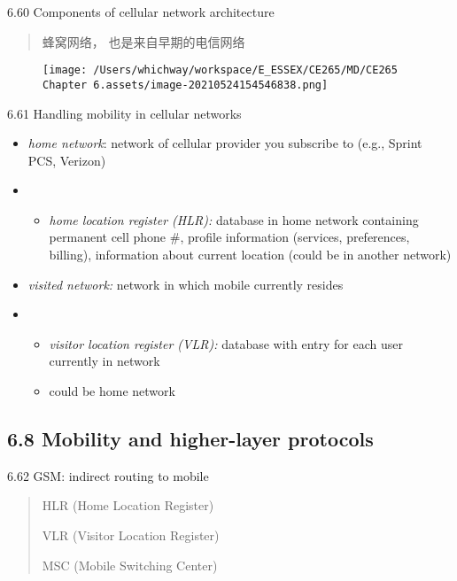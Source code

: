 \documentclass[
]{article}
\begin{document}
6.60 Components of cellular network architecture

\begin{quote}
蜂窝网络， 也是来自早期的电信网络
\end{quote}

\begin{figure}
\centering
\texttt{[image: /Users/whichway/workspace/E\_ESSEX/CE265/MD/CE265 Chapter 6.assets/image-20210524154546838.png]}
\caption{}
\end{figure}

6.61 Handling mobility in cellular networks

\begin{itemize}
\item
  \emph{home network}: network of cellular provider you subscribe to
  (e.g., Sprint PCS, Verizon)
\item
  \begin{itemize}
  \item
    \emph{home location register (HLR):} database in home network
    containing permanent cell phone \#, profile information (services,
    preferences, billing), information about current location (could be
    in another network)
  \end{itemize}
\item
  \emph{visited network:} network in which mobile currently resides
\item
  \begin{itemize}
  \item
    \emph{visitor location register (VLR):} database with entry for each
    user currently in network
  \item
    could be home network
  \end{itemize}
\end{itemize}

\hypertarget{68-mobility-and-higher-layer-protocols}{%
\subsection{6.8 Mobility and higher-layer
protocols}\label{68-mobility-and-higher-layer-protocols}}

6.62 GSM: indirect routing to mobile

\begin{quote}
HLR (Home Location Register)

VLR (Visitor Location Register)

MSC (Mobile Switching Center)
\end{quote}
\end{document}
